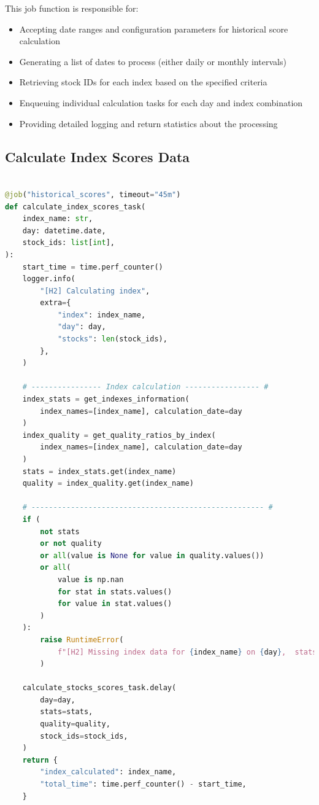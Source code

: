 \documentclass[11pt,english,a4paper,hidelinks]{book}
\begin{document}
\noindent This job function is responsible for:
\begin{itemize}
    \item Accepting date ranges and configuration parameters for historical score calculation
    \item Generating a list of dates to process (either daily or monthly intervals)
    \item Retrieving stock IDs for each index based on the specified criteria
    \item Enqueuing individual calculation tasks for each day and index combination
    \item Providing detailed logging and return statistics about the processing
\end{itemize}

\subsection{Calculate Index Scores Data}
\begin{lstlisting}[language=Python, caption=Calculate Index Scores Data, label={lst:calculate_index_scores_task}]

@job("historical_scores", timeout="45m")
def calculate_index_scores_task(
    index_name: str,
    day: datetime.date,
    stock_ids: list[int],
):
    start_time = time.perf_counter()
    logger.info(
        "[H2] Calculating index",
        extra={
            "index": index_name,
            "day": day,
            "stocks": len(stock_ids),
        },
    )

    # ---------------- Index calculation ----------------- #
    index_stats = get_indexes_information(
        index_names=[index_name], calculation_date=day
    )
    index_quality = get_quality_ratios_by_index(
        index_names=[index_name], calculation_date=day
    )
    stats = index_stats.get(index_name)
    quality = index_quality.get(index_name)

    # ----------------------------------------------------- #
    if (
        not stats
        or not quality
        or all(value is None for value in quality.values())
        or all(
            value is np.nan
            for stat in stats.values()
            for value in stat.values()
        )
    ):
        raise RuntimeError(
            f"[H2] Missing index data for {index_name} on {day},  stats: {stats}, quality: {quality}"
        )

    calculate_stocks_scores_task.delay(
        day=day,
        stats=stats,
        quality=quality,
        stock_ids=stock_ids,
    )
    return {
        "index_calculated": index_name,
        "total_time": time.perf_counter() - start_time,
    }
\end{lstlisting}
\end{document}

